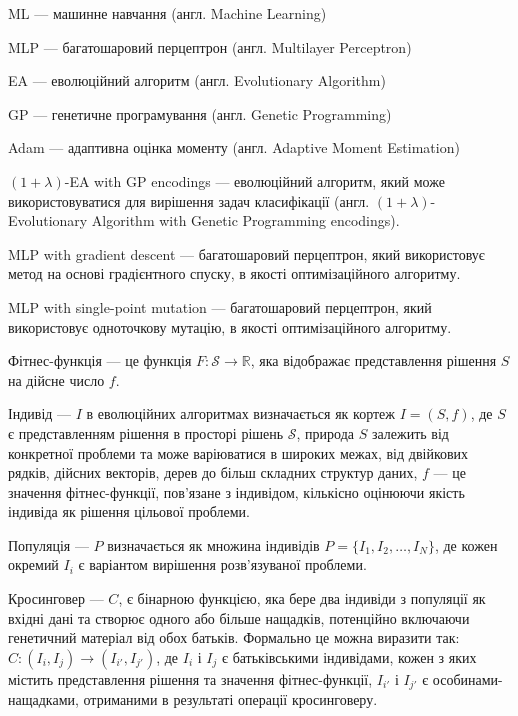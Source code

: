 ML --- машинне навчання (англ. Machine Learning)

MLP --- багатошаровий перцептрон (англ. Multilayer Perceptron)

EA --- еволюційний алгоритм (англ. Evolutionary Algorithm)

GP --- генетичне програмування (англ. Genetic Programming)

Adam --- адаптивна оцінка моменту (англ. Adaptive Moment Estimation)

$(1+\lambda)$-EA with GP encodings --- еволюційний алгоритм, який може використовуватися для вирішення задач класифікації (англ. $(1+\lambda)$-Evolutionary Algorithm with Genetic Programming encodings).

MLP with gradient descent --- багатошаровий перцептрон, який використовує метод на основі градієнтного спуску, в якості оптимізаційного алгоритму.

MLP with single-point mutation --- багатошаровий перцептрон, який використовує одноточкову мутацію, в якості оптимізаційного алгоритму.

Фітнес-функція --- це функція \( F: \mathcal{S} \rightarrow \mathbb{R} \), яка відображає представлення рішення \( S \) на дійсне число \( f \).

Індивід --- \( I \) в еволюційних алгоритмах визначається як кортеж \( I = (S, f) \), де \( S \) є представленням рішення в просторі рішень \( \mathcal{S} \), природа \( S \) залежить від конкретної проблеми та може варіюватися в широких межах, від двійкових рядків, дійсних векторів, дерев до більш складних структур даних, \( f \) — це значення фітнес-функції, пов’язане з індивідом, кількісно оцінюючи якість індивіда як рішення цільової проблеми.

Популяція --- \( P \) визначається як множина індивідів \( P = \{I_1, I_2, \ldots, I_N\} \), де кожен окремий \( I_i \) є варіантом вирішення розв'язуваної проблеми.

Кросинговер --- \( C \), є бінарною функцією, яка бере два індивіди з популяції як вхідні дані та створює одного або більше нащадків, потенційно включаючи генетичний матеріал від обох батьків. Формально це можна виразити так: \( C: (I_i, I_j) \rightarrow (I_{i'}, I_{j'}) \), де \( I_i \) і \( I_j \) є батьківськими індивідами, кожен з яких містить представлення рішення та значення фітнес-функції, \( I_{i'} \) і \( I_{j'} \) є особинами-нащадками, отриманими в результаті операції кросинговеру.

